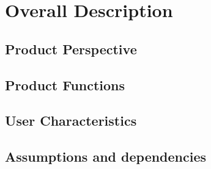 \section{Overall Description}
\subsection{Product Perspective}
\subsection{Product Functions}
\subsection{User Characteristics}
\subsection{Assumptions and dependencies}
